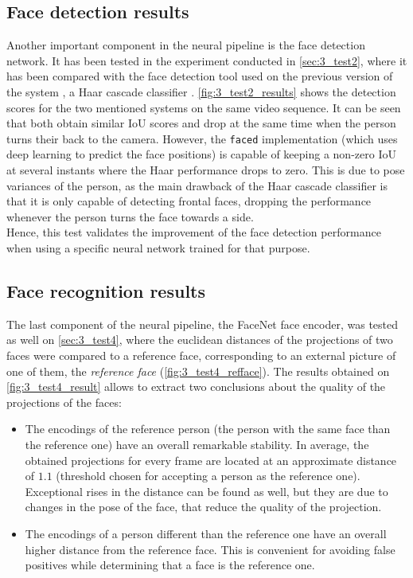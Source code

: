 \subsection{Face detection results}
Another important component in the neural pipeline is the face detection network. It has been tested in the experiment conducted in \autoref{sec:3_test2}, where it has been compared with the face detection tool used on the previous version of the system \cite{tfg}, a Haar cascade classifier \cite{violajones}. \autoref{fig:3_test2_results} shows the detection scores for the two mentioned systems on the same video sequence. It can be seen that both obtain similar IoU scores and drop at the same time when the person turns their back to the camera. However, the \texttt{faced} implementation (which uses deep learning to predict the face positions) is capable of keeping a non-zero IoU at several instants where the Haar performance drops to zero. This is due to pose variances of the person, as the main drawback of the Haar cascade classifier is that it is only capable of detecting frontal faces, dropping the performance whenever the person turns the face towards a side.\\

Hence, this test validates the improvement of the face detection performance when using a specific neural network trained for that purpose.

\subsection{Face recognition results}
The last component of the neural pipeline, the FaceNet face encoder, was tested as well on \autoref{sec:3_test4}, where the euclidean distances of the projections of two faces were compared to a reference face, corresponding to an external picture of one of them, the \textit{reference face} (\autoref{fig:3_test4_refface}). The results obtained on \autoref{fig:3_test4_result} allows to extract two conclusions about the quality of the projections of the faces:

\begin{itemize}
	\item The encodings of the reference person (the person with the same face than the reference one) have an overall remarkable stability. In average, the obtained projections for every frame are located at an approximate distance of $1.1$ (threshold chosen for accepting a person as the reference one). Exceptional rises in the distance can be found as well, but they are due to changes in the pose of the face, that reduce the quality of the projection.\\
	\item The encodings of a person different than the reference one have an overall higher distance from the reference face. This is convenient for avoiding false positives while determining that a face is the reference one.
\end{itemize} 

